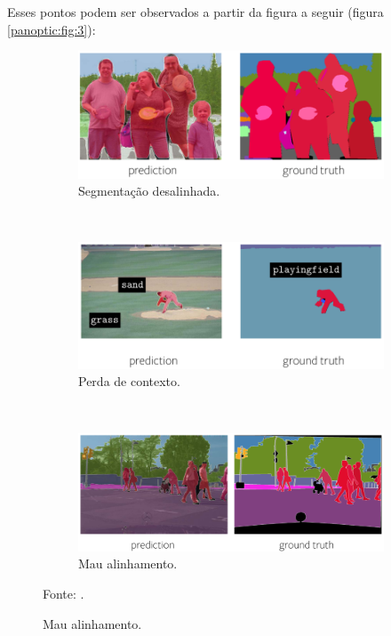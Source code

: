 Esses pontos podem ser observados a partir da figura a seguir (figura \ref{panoptic:fig:3}):

\begin{figure}[H]
   \caption{Falhas de segmentações panópticas.}
   \centering
   \label{panoptic:fig:3}
    \begin{subfigure}[t]{0.7\textwidth}
        \centering
        \includegraphics[width=1\linewidth]{recursos/imagens/mau_adaptadas.png}
        \caption{Segmentação desalinhada.}
        \label{panoptic:fig:3.1}
    \end{subfigure}%
    ~ 

    \begin{subfigure}[t]{0.7\textwidth}
        \centering
        \includegraphics[width=1\linewidth]{recursos/imagens/perda_contexto.png}
        \caption{Perda de contexto.}
        \label{panoptic:fig:3.2}
    \end{subfigure}%
    ~ 
    
    \begin{subfigure}[t]{0.7\textwidth}
        \centering
        \includegraphics[width=1\linewidth]{recursos/imagens/mau_alinhamento.png}
        \caption{Mau alinhamento.}
        \label{panoptic:fig:1.3}
    \end{subfigure}

    \vspace*{1 cm}
    Fonte: \cite{Christoph2019VisualBeyond}.
\end{figure}